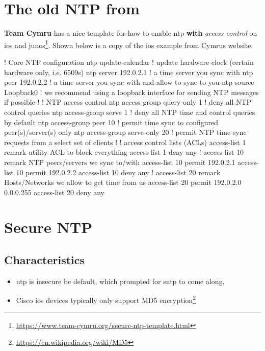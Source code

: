
\section{The old NTP from }

\textbf{Team Cymru} has a nice template for how to enable \gls{ntp} \textbf{with} \textit{access control} on \gls{ios} and \gls{junos}\footnote{\url{https://www.team-cymru.org/secure-ntp-template.html}}. Shown below is a copy of the \gls{ios} example from Cymrus website.

\begin{cisco}
	! Core NTP configuration
	ntp update-calendar             ! update hardware clock (certain hardware only, i.e. 6509s)
	ntp server 192.0.2.1            ! a time server you sync with
	ntp peer   192.0.2.2            ! a time server you sync with and allow to sync to you
	ntp source Loopback0            ! we recommend using a loopback interface for sending NTP messages if possible
	!
	! NTP access control
	ntp access-group query-only 1   ! deny all NTP control queries
	ntp access-group serve 1        ! deny all NTP time and control queries by default
	ntp access-group peer 10        ! permit time sync to configured peer(s)/server(s) only
	ntp access-group serve-only 20  ! permit NTP time sync requests from a select set of clients
	!
	! access control lists (ACLs)
	access-list 1 remark utility ACL to block everything
	access-list 1 deny any
	!
	access-list 10 remark NTP peers/servers we sync to/with
	access-list 10 permit 192.0.2.1
	access-list 10 permit 192.0.2.2
	access-list 10 deny any
	!
	access-list 20 remark Hosts/Networks we allow to get time from us
	access-list 20 permit 192.0.2.0 0.0.0.255
	access-list 20 deny any
	
\end{cisco}

\section{Secure NTP}

\subsection{Characteristics}

\begin{itemize}
	\item \gls{ntp} is insecure be default, whích prompted for \gls{sntp} to come along,
	\item Cisco \gls{ios} devices typically only support MD5 encryption\footnote{\url{https://en.wikipedia.org/wiki/MD5}}
\end{itemize}


